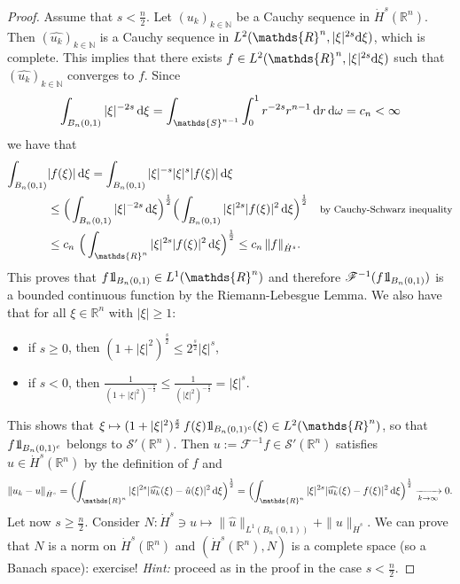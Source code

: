 \documentclass[a4paper, 12pt]{article}
\theoremstyle{plain}
\theoremstyle{definition}
\theoremstyle{remark}
\numberwithin{equation}{section}
\begin{document}
\begin{proof}
Assume that $s<\frac{n}{2}$. Let $(u_k)_{k\in{\mathds{N}}}$ be a Cauchy sequence in $\dot H^s({\mathds{R}}^n)$. Then 
$(\widehat{u_k})_{k\in{\mathds{N}}}$ is a Cauchy sequence in $L^2({\mathds{R}}^n, |\xi|^{2s}{\rm d}\xi)$, which is complete. 
This implies that there exists $f\in L^2({\mathds{R}}^n, |\xi|^{2s}{\rm d}\xi)$ such that $(\widehat{u_k})_{k\in{\mathds{N}}}$ converges to $f$. 
Since
\[
\int_{B_n(0,1)}|\xi|^{-2s}\,{\rm d}\xi = \int_{{\mathds{S}}^{n-1}}\int_0^1 r^{-2s}r^{n-1}\,{\rm d}r\,{\rm d}\omega =c_n<\infty
\]
we have that
%
\begin{align*}
\int_{B_n(0,1)}&|f(\xi)|\,{\rm d}\xi = \int_{B_n(0,1)}|\xi|^{-s}|\xi|^s|f(\xi)|\,{\rm d}\xi\\
&\le \Big(\int_{B_n(0,1)}|\xi|^{-2s}\,{\rm d}\xi\Big)^{\frac{1}{2}} \Big(\int_{B_n(0,1)}|\xi|^{2s}|f(\xi)|^2\,{\rm d}\xi\Big)^{\frac{1}{2}} 
\quad\mbox{\footnotesize by Cauchy-Schwarz inequality}\\
&\le c_n\ \Big(\int_{{\mathds{R}}^n}|\xi|^{2s}|f(\xi)|^2\,{\rm d}\xi\Big)^{\frac{1}{2}} \le c_n\,\|f\|_{\dot H^s}. 
\end{align*}
%
This proves that $f 1\hspace{-2pt}{\rm l}_{B_n(0,1)}\in L^1({\mathds{R}}^n)$ and therefore 
${\mathscr{F}}^{-1}(f 1\hspace{-2pt}{\rm l}_{B_n(0,1)})$ is a bounded continuous function by the Riemann-Lebesgue Lemma.
We also have that for all $\xi \in {\mathds{R}}^n$ with $|\xi|\ge 1$:
%
\begin{itemize}
\item
if $s\ge 0$, then $(1+|\xi|^2)^{\frac{s}{2}}\le 2^{\frac{s}{2}} |\xi|^s$,
\item
if $s<0$, then $\frac{1}{(1+|\xi|^2)^{-\frac{s}{2}}} \le \frac{1}{(|\xi|^2)^{-\frac{s}{2}}} =|\xi|^s$.
\end{itemize}
This shows that
$\xi\mapsto (1+|\xi|^2)^{\frac{s}{2}}\,f(\xi) 1\hspace{-2pt}{\rm l}_{B_n(0,1)^c}(\xi) \in L^2({\mathds{R}}^n)$, so that 
$f 1\hspace{-2pt}{\rm l}_{B_n(0,1)^c}$ belongs to ${\mathscr{S}}'({\mathds{R}}^n)$. Then 
$u:={\mathscr{F}}^{-1}f\in {\mathscr{S}}'({\mathds{R}}^n)$ satisfies $\hat{u}\in \dot H^s({\mathds{R}}^n)$ by the definition of $f$ and
\[
\|u_k-u\|_{\dot H^s}=\Bigl(\int_{{\mathds{R}}^n} |\xi|^{2s}|\widehat{u_k}(\xi)-\hat{u}(\xi)|^2\,{\rm d}\xi\Bigr)^{\frac{1}{2}}
=\Bigl(\int_{{\mathds{R}}^n} |\xi|^{2s}|\widehat{u_k}(\xi)-f(\xi)|^2\,{\rm d}\xi\Bigr)^{\frac{1}{2}}\xrightarrow[k\to\infty]{}0.
\]
Let now $s\ge \frac{n}{2}$. Consider $N:\dot H^s\ni u\mapsto \|\hat{u}\|_{L^1(B_n(0,1))}+\|u\|_{\dot H^s}$. We can prove that
$N$ is a norm on $\dot H^s({\mathds{R}}^n)$ and $(\dot H^s({\mathds{R}}^n), N)$ is a complete space (so a Banach space): exercise!
{\sl Hint:} proceed as in the proof in the case $s<\frac{n}{2}$.


\end{proof}
\end{document}
